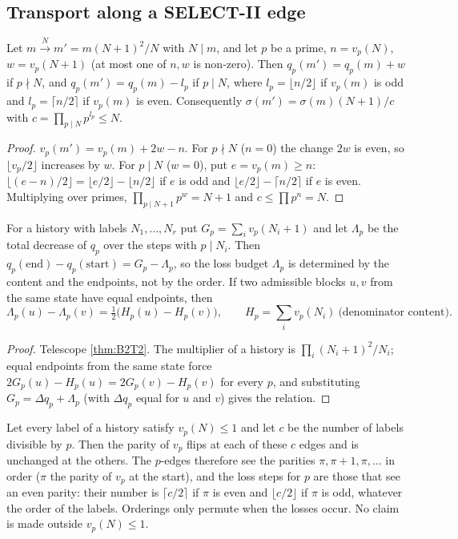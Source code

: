\subsection{Transport along a SELECT-II edge}
\begin{theorem}\label{thm:B2T2}
Let $m\xrightarrow{N}m'=m(N+1)^2/N$ with $N\mid m$, and let $p$ be a prime, $n=v_p(N)$, $w=v_p(N+1)$ (at most one of $n,w$ is non-zero). Then $q_p(m')=q_p(m)+w$ if $p\nmid N$, and $q_p(m')=q_p(m)-l_p$ if $p\mid N$, where $l_p=\lfloor n/2\rfloor$ if $v_p(m)$ is odd and $l_p=\lceil n/2\rceil$ if $v_p(m)$ is even. Consequently $\sigma(m')=\sigma(m)(N+1)/c$ with $c=\prod_{p\mid N}p^{l_p}\le N$.
\end{theorem}
\begin{proof}
$v_p(m')=v_p(m)+2w-n$. For $p\nmid N$ ($n=0$) the change $2w$ is even, so $\lfloor v_p/2\rfloor$ increases by $w$. For $p\mid N$ ($w=0$), put $e=v_p(m)\ge n$: $\lfloor(e-n)/2\rfloor=\lfloor e/2\rfloor-\lfloor n/2\rfloor$ if $e$ is odd and $\lfloor e/2\rfloor-\lceil n/2\rceil$ if $e$ is even. Multiplying over primes, $\prod_{p\mid N+1}p^{w}=N+1$ and $c\le\prod p^{n}=N$. \qedhere
\end{proof}
\begin{theorem}\label{thm:B2T3}
For a history with labels $N_1,\dots,N_r$ put $G_p=\sum_iv_p(N_i+1)$ and let $\Lambda_p$ be the total decrease of $q_p$ over the steps with $p\mid N_i$. Then $q_p(\mathrm{end})-q_p(\mathrm{start})=G_p-\Lambda_p$, so the loss budget $\Lambda_p$ is determined by the content and the endpoints, not by the order. If two admissible blocks $u,v$ from the same state have equal endpoints, then
\[
\Lambda_p(u)-\Lambda_p(v)=\tfrac12\big(H_p(u)-H_p(v)\big),\qquad H_p=\sum_iv_p(N_i)\ \text{(denominator content).}
\]
\end{theorem}
\begin{proof}
Telescope \cref{thm:B2T2}. The multiplier of a history is $\prod_i(N_i+1)^2/N_i$; equal endpoints from the same state force $2G_p(u)-H_p(u)=2G_p(v)-H_p(v)$ for every $p$, and substituting $G_p=\Delta q_p+\Lambda_p$ (with $\Delta q_p$ equal for $u$ and $v$) gives the relation. \qedhere
\end{proof}
\begin{theorem}\label{thm:B2T4}
Let every label of a history satisfy $v_p(N)\le1$ and let $c$ be the number of labels divisible by $p$. Then the parity of $v_p$ flips at each of these $c$ edges and is unchanged at the others. The $p$-edges therefore see the parities $\pi,\pi+1,\pi,\dots$ in order ($\pi$ the parity of $v_p$ at the start), and the loss steps for $p$ are those that see an even parity: their number is $\lceil c/2\rceil$ if $\pi$ is even and $\lfloor c/2\rfloor$ if $\pi$ is odd, whatever the order of the labels. Orderings only permute when the losses occur. No claim is made outside $v_p(N)\le1$.
\end{theorem}
